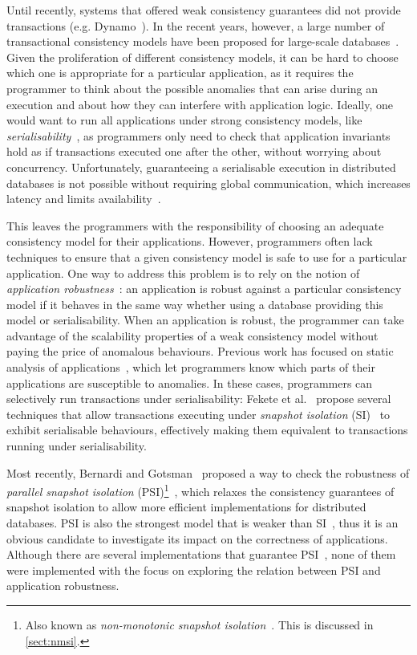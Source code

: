 Until recently, systems that offered weak consistency guarantees did not provide transactions (e.g. Dynamo~\citep{dynamo-amz}). In the recent years, however, a large number of transactional consistency models have been proposed for large-scale databases~\citep{psi-intro, ardekani_nmsi, lloyd_cops, bailis_ramp}. Given the proliferation of different consistency models, it can be hard to choose which one is appropriate for a particular application, as it requires the programmer to think about the possible anomalies that can arise during an execution and about how they can interfere with application logic. Ideally, one would want to run all applications under strong consistency models, like \emph{serialisability}~\citep{bernstein_concurrency}, as programmers only need to check that application invariants hold as if transactions executed one after the other, without worrying about concurrency. Unfortunately, guaranteeing a serialisable execution in distributed databases is not possible without requiring global communication, which increases latency and limits availability~\citep{cap-theorem}.

This leaves the programmers with the responsibility of choosing an adequate consistency model for their applications. However, programmers often lack techniques to ensure that a given consistency model is safe to use for a particular application. One way to address this problem is to rely on the notion of \emph{application robustness}~\citep{fekete_ssi, concur_robustness}: an application is robust against a particular consistency model if it behaves in the same way whether using a database providing this model or serialisability. When an application is robust, the programmer can take advantage of the scalability properties of a weak consistency model without paying the price of anomalous behaviours. Previous work has focused on static analysis of applications~\citep{sudhir_static, cise_tool}, which let programmers know which parts of their applications are susceptible to anomalies. In these cases, programmers can selectively run transactions under serialisability: Fekete et al.~\citep{fekete_ssi, fekete_isolation_levels} propose several techniques that allow transactions executing under \emph{snapshot isolation} (SI)~\citep{sql-critique} to exhibit serialisable behaviours, effectively making them equivalent to transactions running under serialisability.

Most recently, Bernardi and Gotsman~\citep{concur_robustness} proposed a way to check the robustness of \emph{parallel snapshot isolation} (PSI)\footnote{Also known as \emph{non-monotonic snapshot isolation}~\citep{ardekani_nmsi}. This is discussed in \textsection\ref{sect:nmsi}.}~\citep{psi-intro}, which relaxes the consistency guarantees of snapshot isolation to allow more efficient implementations for distributed databases. PSI is also the strongest model that is weaker than SI~\citep{concur_framework}, thus it is an obvious candidate to investigate its impact on the correctness of applications. Although there are several implementations that guarantee PSI~\citep{psi-intro, ardekani_nmsi, moniz_blotter}, none of them were implemented with the focus on exploring the relation between PSI and application robustness.

